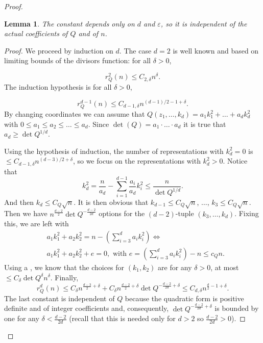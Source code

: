 \documentclass{amsart}
\newtheorem{lemma}[theorem]{Lemma}
\theoremstyle{definition}
\theoremstyle{remark}
\newcommand{\ep}{\varepsilon}
\renewcommand\leq\leqslant
\renewcommand\geq\geqslant
\numberwithin{equation}{section}
\theoremstyle{definition}
\theoremstyle{remark}
\begin{document}
\begin{proof}
\begin{lemma}
			The constant depends only on $d$ and $\ep$, so it is independent of the actual coefficients of $Q$ and of $n$.
	\end{lemma}
	\begin{proof}
		
		We proceed by induction on $d$. The case $d=2$ is well known and based on limiting bounds of the divisors function: for all $\delta>0$,
		
		\begin{equation}
			r^2_Q(n)\leq C_{2,\delta} n^{\delta} .
		\end{equation} 
		The induction hypothesis is for all $\delta>0$,
		
		\begin{equation}
			r_Q^{d-1}(n)\leq C_{d-1,\delta} n^{(d-1) / 2-1+\delta} . 
		\end{equation}
		By changing coordinates we can assume that $Q(z_1,\ldots,k_d)=a_1k_1^2+\ldots+a_dk_d^2$ with $0\leq a_1\leq a_2\leq \ldots \leq a_d$. Since $\det(Q)=a_1\cdot\ldots\cdot a_d$ it is true that $a_d\geq \det Q^{1/d}$.
		
		Using the hypothesis of induction, the number of representations with $k_d^2=0$ is $\leq C_{d-1,\delta}n^{(d-3)/2+\delta}$, so we focus on the representations with $k_d^2>0$. Notice that \begin{equation}
			k_d^2=\frac{n}{a_d}-\sum_{i=1}^{d-1}\frac{a_i}{a_d}k_i^2\leq \frac{n}{ \det Q^{1/d}}.
		\end{equation} And then $k_d\leq C_Q\sqrt{n}$. It is then obvious that $k_{d-1}\leq C_Q\sqrt{n}$, $\ldots$, $k_{3}\leq C_Q\sqrt{n}$. Then we have $n^{\frac{d-2}{2}}\det Q^{-\frac{d-2}{2d}}$ options for the $(d-2)$-tuple $(k_3,\ldots,k_d)$. Fixing this, we are left with \begin{equation}
			\begin{aligned}
			    &a_1k_1^2+a_2k_2^2=n-\left(\sum_{i=3}^{d}a_ik_i^2\right) \iff\\& a_1k_1^2+a_2k_2^2+e=0,\text{ with }e=\left(\sum_{i=3}^{d}a_ik_i^2\right)-n\leq c_Q n.
			\end{aligned}
		\end{equation}
		Using a \cite[Lemma 8]{Blomer}, we know that the choices for $(k_1,k_2)$ are for any $\delta>0$, at most $\leq C_\delta \det Q^\delta n^\delta$. 
		Finally, \begin{equation}
			r_Q^d(n)\leq C_\delta n^{\frac{d-3}{2}+\delta}+C_\delta n^{\frac{d-2}{2}+\delta}\det Q^{-\frac{d-2}{2d}+\delta}\leq C_{d,\delta}n^{\frac{d}{2}-1+\delta}.
		\end{equation}The last constant is independent of $Q$ because the quadratic form is positive definite and of integer coefficients and, consequently, $\det Q^{-\frac{d-2}{2d}+\delta}$ is bounded by one for any $\delta<\frac{d-2}{2d}$ (recall that this is needed only for $d>2$ so $\frac{d-2}{2d}>0$).
	\end{proof}			
	

\end{proof}
\end{document}
